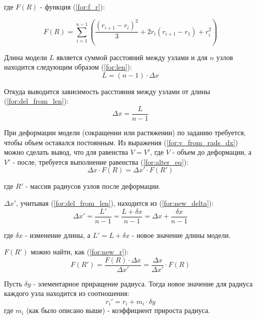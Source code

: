 где $F(R)$ - функция (\ref{for:f_r}):

\begin{equation}
    \label{for:f_r}
    F(R) = \sum_{i=1}^{n-1} \left(\frac{(r_{i + 1} - r_i)^2}{3} + 2 r_i (r_{i + 1} - r_1) + r_i^2 \right)
\end{equation}


Длина модели $L$ является суммой расстояний между узлами и для $n$ узлов находится следующим образом (\ref{for:len}):
\begin{equation}
    \label{for:len}
    L = (n - 1) \cdot \Delta x
\end{equation}

Откуда выводится зависимость расстояния между узлами от длины (\ref{for:del_from_len}):
\begin{equation}
    \label{for:del_from_len}
    \Delta x = \frac{L}{n - 1}
\end{equation}

При деформации модели (сокращении или растяжении) по заданию требуется, чтобы объем оставался постоянным. Из выражения (\ref{for:v_from_rads_dx}) можно сделать вывод, что для равенства $V = V'$, где $V$ - объем до деформации, а $V'$ - после, требуется выполнение равенства (\ref{for:alter_eq}):
\begin{equation}
    \label{for:alter_eq}
    \Delta x \cdot F(R) = \Delta x' \cdot F(R')
\end{equation}

где $R'$ - массив радиусов узлов после деформации.

$\Delta x'$, учитывая (\ref{for:del_from_len}), находится из (\ref{for:new_delta}):
\begin{equation}
    \label{for:new_delta}
    \Delta x' = \frac{L'}{n - 1} = \frac{L + \delta x}{n - 1} = \Delta x + \frac{\delta x}{n - 1}
\end{equation}

где $\delta x$ - изменение длины, а $L' = L + \delta x$ - новое значение длины модели.

$F(R')$ можно найти, как (\ref{for:new_r}):
\begin{equation}
    \label{for:new_r}
    F(R') = \frac{F(R) \cdot \Delta x}{\Delta x'} = \frac{\Delta x}{\Delta x'} \cdot F(R)
\end{equation}

Пусть $\delta y$ - элементарное приращение радиуса. Тогда новое значение для радиуса каждого узла находится из соотношения:
\begin{equation}
    \label{for:new_rad}
    r_i' = r_i + m_i \cdot \delta y
\end{equation}
где $m_i$ (как было описано выше) - коэффициент прироста радиуса.

